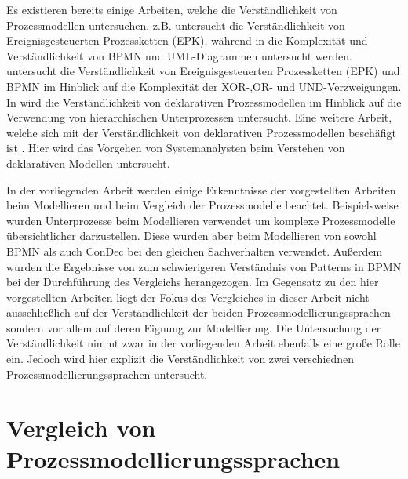 Es existieren bereits einige Arbeiten, welche die Verständlichkeit von Prozessmodellen untersuchen. \cite{bpm07} z.B. untersucht die Verständlichkeit von Ereignisgesteuerten Prozessketten (EPK), während in \cite{gruhn2006complexity} die Komplexität und Verständlichkeit von BPMN und UML-Diagrammen untersucht werden. \cite{reijers2011study} untersucht die Verständlichkeit von Ereignisgesteuerten Prozessketten (EPK) und BPMN im Hinblick auf die Komplexität der XOR-,OR- und UND-Verzweigungen. \newline
In \cite{sabrina942} wird die Verständlichkeit von deklarativen Prozessmodellen im Hinblick auf die Verwendung von hierarchischen Unterprozessen untersucht. Eine weitere Arbeit, welche sich mit der Verständlichkeit von deklarativen Prozessmodellen beschäfigt ist \cite{haisjackl2014understanding}. Hier wird das Vorgehen von Systemanalysten beim Verstehen von deklarativen Modellen untersucht.\newline

In der vorliegenden Arbeit werden einige Erkenntnisse der vorgestellten Arbeiten beim Modellieren und beim Vergleich der Prozessmodelle beachtet. Beispielsweise wurden Unterprozesse beim  Modellieren verwendet um komplexe Prozessmodelle übersichtlicher darzustellen. Diese wurden  aber beim Modellieren von sowohl BPMN als auch ConDec bei den gleichen Sachverhalten verwendet.\newline
Außerdem wurden die Ergebnisse von \cite{ haisjackl2014understanding} zum schwierigeren Verständnis von Patterns in BPMN bei der Durchführung des Vergleichs herangezogen.\newline
Im Gegensatz zu den hier vorgestellten Arbeiten liegt der Fokus des Vergleiches in dieser Arbeit nicht ausschließlich auf der Verständlichkeit der beiden Prozessmodellierungssprachen sondern vor allem auf deren Eignung zur Modellierung. Die Untersuchung der Verständlichkeit nimmt zwar in der vorliegenden Arbeit ebenfalls eine große Rolle ein. Jedoch wird hier explizit die Verständlichkeit von zwei verschiednen Prozessmodellierungssprachen untersucht.\newline


\section{Vergleich von Prozessmodellierungssprachen}

